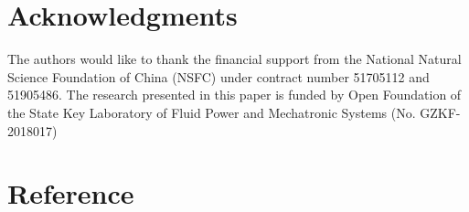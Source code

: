 \documentclass{elsarticle}
\begin{document}
\section*{Acknowledgments}
The authors would like to thank the financial support from the National Natural Science Foundation of China (NSFC) under contract number 51705112 and 51905486. The research presented in this paper is funded by Open Foundation of the State Key Laboratory of Fluid Power and Mechatronic Systems (No. GZKF-2018017)


\section*{Reference}



\end{document}

